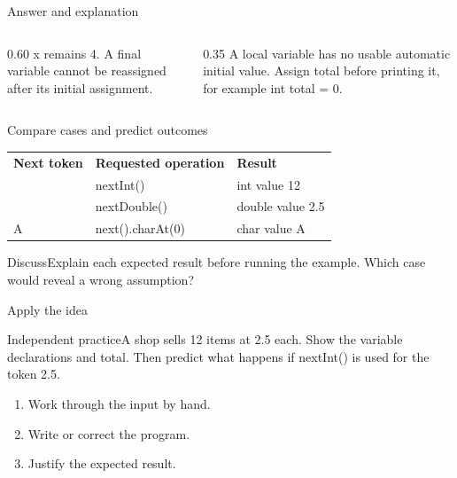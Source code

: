 \documentclass[10pt,aspectratio=169]{beamer}
\begin{document}
\begin{frame}[fragile,t]{Answer and explanation}
\begin{columns}[T,onlytextwidth]\begin{column}{0.60\textwidth}
x remains 4. A final variable cannot be reassigned after its initial assignment.
\end{column}\begin{column}{0.35\textwidth}\small
A local variable has no usable automatic initial value. Assign total before printing it, for example int total = 0.
\end{column}\end{columns}
\end{frame}


\begin{frame}[fragile,t]{Compare cases and predict outcomes}
\small\renewcommand{\arraystretch}{1.5}
\begin{tabularx}{\textwidth}{>{\raggedright\arraybackslash}X>{\raggedright\arraybackslash}X>{\raggedright\arraybackslash}X}\rowcolor{navy}
\color{white}\bfseries Next token & \color{white}\bfseries Requested operation & \color{white}\bfseries Result\\
12 & nextInt() & int value 12\\
2.5 & nextDouble() & double value 2.5\\
A & next().charAt(0) & char value A\\
\end{tabularx}\par\vspace{3mm}\begin{exampleblock}{Discuss}Explain each expected result before running the example. Which case would reveal a wrong assumption?\end{exampleblock}
\end{frame}

\begin{frame}[fragile,t]{Apply the idea}
\begin{alertblock}{Independent practice}A shop sells 12 items at 2.5 each. Show the variable declarations and total. Then predict what happens if nextInt() is used for the token 2.5.\end{alertblock}\vspace{3mm}\begin{enumerate}\item Work through the input by hand.\item Write or correct the program.\item Justify the expected result.\end{enumerate}
\end{frame}
\end{document}
